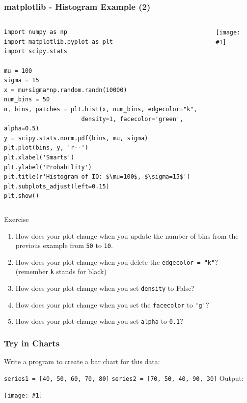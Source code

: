 \documentclass[xcolor=svgnames]{beamer}
\newcommand{\ipic}[2]{\texttt{[image: \#1]}}
\newcommand{\ft}[1]{\frametitle{#1}}
\begin{document}
\begin{frame}[fragile]\ft{matplotlib - Histogram Example (2)}
\begin{columns}[T] %
\begin{column}{.5\textwidth}
\begin{Verbatim}[fontsize=\small,xleftmargin=.1in] 
import numpy as np
import matplotlib.pyplot as plt
import scipy.stats

mu = 100
sigma = 15
x = mu+sigma*np.random.randn(10000)
num_bins = 50
n, bins, patches = plt.hist(x, num_bins, edgecolor="k",
                      density=1, facecolor='green', alpha=0.5)
y = scipy.stats.norm.pdf(bins, mu, sigma)
plt.plot(bins, y, 'r--')
plt.xlabel('Smarts')
plt.ylabel('Probability')
plt.title(r'Histogram of IQ: $\mu=100$, $\sigma=15$')
plt.subplots_adjust(left=0.15)
plt.show()
\end{Verbatim}
\end{column}%
\hfill%
\begin{column}{.46\textwidth}
\hspace*{.2in}\ipic{hist2}{0.9}
\end{column}%
\end{columns}
\end{frame}

\begin{frame}[fragile]
\begin{exampleblock}{Exercise}
\begin{enumerate}
\item How does your plot change when you update the number of bins from the previous example from {\tt 50} to {\tt 10}.
\item How does your plot change when you delete the {\tt edgecolor = "k"}? (remember {\tt k} stands for black)
\item How does your plot change when you set {\tt density} to False?
\item How does your plot change when you set the {\tt facecolor} to \verb|'g'|?
\item How does your plot change when you set {\tt alpha} to {\tt 0.1}?
\end{enumerate}


\end{exampleblock}

\end{frame}



\begin{frame}\ft{Try in Charts}
\begin{example}
 Write a program to create a bar chart for this data:

{\tt series1 = [40, 50, 60, 70, 80]}\newline
{\tt series2 = [70, 50, 40, 90, 30]}\newline
Output:
\end{example}
\begin{center}
\ipic{barchart}{0.6}\end{center}



\end{frame}
\end{document}
